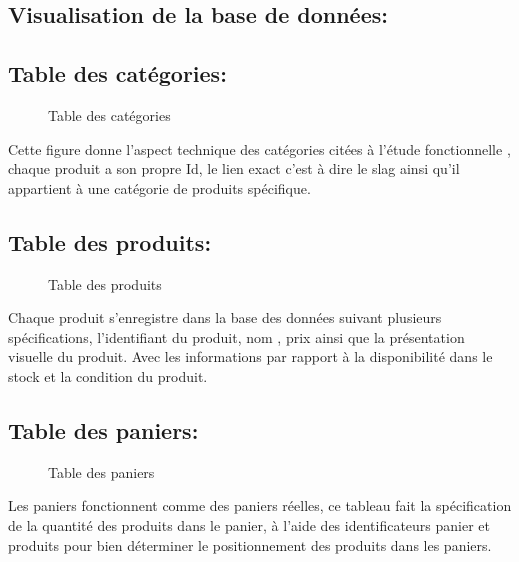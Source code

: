 \documentclass[a4paper]{report}
\begin{document}
\begin{doublespace}
\begin{doublespace}
\begin{doublespace}
\begin{doublespace}
\begin{doublespace}
\begin{doublespace}
                        \section{ Visualisation de la base de données:}
                        \subsection{ Table des catégories: }
                        \begin{figure}[H]
                            \caption{Table des catégories}
                        \end{figure}
                        Cette figure donne l'aspect technique des catégories citées à l'étude
                        fonctionnelle , chaque produit a son propre Id, le lien exact c'est à dire le slag ainsi qu'il appartient à une catégorie de produits spécifique.
                        \subsection{ Table des produits: }
                        \begin{figure}[H]

                            \caption{Table des produits}
                        \end{figure}
                        Chaque produit s'enregistre dans la base des données suivant plusieurs spécifications, l'identifiant du produit, nom , prix ainsi que la présentation visuelle du produit. Avec les informations par rapport à la disponibilité dans le stock et la condition du produit.
                        \subsection{ Table des paniers: }
                        \begin{figure}[H]

                            \caption{Table des paniers}
                        \end{figure}
                        Les paniers fonctionnent comme des paniers réelles, ce tableau fait la spécification de la quantité des produits dans le panier,  à l'aide des identificateurs panier et produits pour bien déterminer le positionnement des produits dans les paniers.

\end{doublespace}
\end{doublespace}
\end{doublespace}
\end{doublespace}
\end{doublespace}
\end{doublespace}
\end{document}
